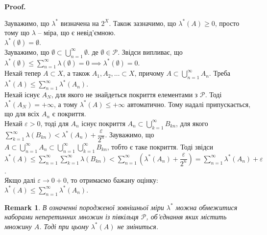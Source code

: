 \documentclass[a4paper, 10pt]{article}
\makeatletter
\theoremstyle{theoremdd}
\newtheorem{remark}[theorem]{Remark}
\renewenvironment{proof}[1][Proof.\\]{\par
\pushQED{\hfill \qed}%
\normalfont \topsep6\p@\@plus6\p@\relax
\trivlist
\item\relax
{\bfseries
#1\@addpunct{.}}\hspace\labelsep\ignorespaces
}{%
\popQED\endtrivlist\@endpefalse
}
\makeatother
\begin{document}
\begin{proof}
Зауважимо, що $\lambda^*$ визначена на $2^X$. Також зазначимо, що $\lambda^*(A) \geq 0$, просто тому що $\lambda$ -- міра, що є невід'ємною.
\bigskip \\
$\lambda^*(\emptyset) = \emptyset$.\\
Зауважимо, що $\emptyset \subset \displaystyle\bigcup_{n=1}^\infty \emptyset$. де $\emptyset \in \mathcal{P}$. Звідси випливає, що $\lambda^*(\emptyset) \leq \displaystyle\sum_{n=1}^\infty \lambda(\emptyset) = 0 \implies \lambda^*(\emptyset) = 0$.
\bigskip \\
Нехай тепер $A \subset X$, а також $A_1,A_2,\dots \subset X$, причому $A \subset \displaystyle\bigcup_{n=1}^\infty A_n$. Треба $\lambda^*(A) \leq \displaystyle\sum_{n=1}^\infty \lambda^*(A_n)$.\\
Нехай існує $A_N$, для якого не знайдеться покриття елементами з $\mathcal{P}$. Тоді $\lambda^*(A_N) = +\infty$, а тому $\lambda^*(A) \leq +\infty$ автоматично. Тому надалі припускається, що для всіх $A_n$ є покриття.\\
Нехай $\varepsilon > 0$, тоді для $A_n$ існує покриття $A_n \subset \displaystyle\bigcup_{k=1}^\infty B_{kn}$, для якого $\displaystyle\sum_{k=1}^\infty \lambda(B_{kn}) < \lambda^*(A_n) + \dfrac{\varepsilon}{2^n}$. Зауважимо, що $A \subset \displaystyle\bigcup_{n=1}^\infty A_n \subset \bigcup_{n=1}^\infty \bigcup_{k=1}^\infty B_{kn}$, тобто є таке покриття. Тоді звідси\\
$\lambda^*(A) \leq \displaystyle\sum_{n=1}^\infty \sum_{k=1}^\infty \lambda(B_{kn}) < \sum_{n=1}^\infty \left( \lambda^*(A_n) + \dfrac{\varepsilon}{2^n} \right) = \sum_{n=1}^\infty \lambda^*(A_n) + \varepsilon$.\\
Якщо далі $\varepsilon \to 0+0$, то отримаємо бажану оцінку:\\
$\lambda^*(A) \leq \displaystyle\sum_{n=1}^\infty \lambda^*(A_n)$.
\end{proof}

\begin{remark}
В означенні породженої зовнішньої міри $\lambda^*$ можна обмежитися наборами неперетинних множин із півкільця $\mathcal{P}$, об'єднання яких містить множину $A$. Тоді при цьому $\lambda^*(A)$ не зміниться.
\end{remark}
\end{document}
